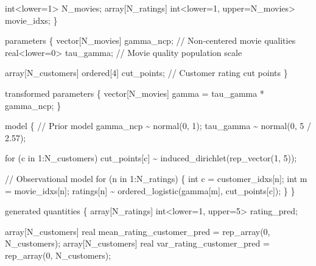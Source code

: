 \documentclass[
  letterpaper,
  DIV=11,
  numbers=noendperiod]{scrartcl}
\newenvironment{Shaded}{\begin{snugshade}}{\end{snugshade}}
\newcommand{\CommentTok}[1]{\textcolor[rgb]{0.37,0.37,0.37}{#1}}
\newcommand{\ControlFlowTok}[1]{\textcolor[rgb]{0.00,0.23,0.31}{#1}}
\newcommand{\DataTypeTok}[1]{\textcolor[rgb]{0.68,0.00,0.00}{#1}}
\newcommand{\DecValTok}[1]{\textcolor[rgb]{0.68,0.00,0.00}{#1}}
\newcommand{\FloatTok}[1]{\textcolor[rgb]{0.68,0.00,0.00}{#1}}
\newcommand{\KeywordTok}[1]{\textcolor[rgb]{0.00,0.23,0.31}{#1}}
\newcommand{\NormalTok}[1]{\textcolor[rgb]{0.00,0.23,0.31}{#1}}
\begin{document}
\begin{codelisting}
\begin{Shaded}
\begin{Highlighting}[]
  \DataTypeTok{int}\NormalTok{\textless{}}\KeywordTok{lower}\NormalTok{=}\DecValTok{1}\NormalTok{\textgreater{} N\_movies;}
  \DataTypeTok{array}\NormalTok{[N\_ratings] }\DataTypeTok{int}\NormalTok{\textless{}}\KeywordTok{lower}\NormalTok{=}\DecValTok{1}\NormalTok{, }\KeywordTok{upper}\NormalTok{=N\_movies\textgreater{} movie\_idxs;}
\NormalTok{\}}

\KeywordTok{parameters}\NormalTok{ \{}
  \DataTypeTok{vector}\NormalTok{[N\_movies] gamma\_ncp; }\CommentTok{// Non{-}centered movie qualities}
  \DataTypeTok{real}\NormalTok{\textless{}}\KeywordTok{lower}\NormalTok{=}\DecValTok{0}\NormalTok{\textgreater{} tau\_gamma;    }\CommentTok{// Movie quality population scale}

  \DataTypeTok{array}\NormalTok{[N\_customers] }\DataTypeTok{ordered}\NormalTok{[}\DecValTok{4}\NormalTok{] cut\_points; }\CommentTok{// Customer rating cut points}
\NormalTok{\}}

\KeywordTok{transformed parameters}\NormalTok{ \{}
  \DataTypeTok{vector}\NormalTok{[N\_movies] gamma = tau\_gamma * gamma\_ncp;}
\NormalTok{\}}

\KeywordTok{model}\NormalTok{ \{}
  \CommentTok{// Prior model}
\NormalTok{  gamma\_ncp \textasciitilde{} normal(}\DecValTok{0}\NormalTok{, }\DecValTok{1}\NormalTok{);}
\NormalTok{  tau\_gamma \textasciitilde{} normal(}\DecValTok{0}\NormalTok{, }\DecValTok{5}\NormalTok{ / }\FloatTok{2.57}\NormalTok{);}

  \ControlFlowTok{for}\NormalTok{ (c }\ControlFlowTok{in} \DecValTok{1}\NormalTok{:N\_customers)}
\NormalTok{    cut\_points[c] \textasciitilde{} induced\_dirichlet(rep\_vector(}\DecValTok{1}\NormalTok{, }\DecValTok{5}\NormalTok{));}

  \CommentTok{// Observational model}
  \ControlFlowTok{for}\NormalTok{ (n }\ControlFlowTok{in} \DecValTok{1}\NormalTok{:N\_ratings) \{}
    \DataTypeTok{int}\NormalTok{ c = customer\_idxs[n];}
    \DataTypeTok{int}\NormalTok{ m = movie\_idxs[n];}
\NormalTok{    ratings[n] \textasciitilde{} ordered\_logistic(gamma[m], cut\_points[c]);}
\NormalTok{  \}}
\NormalTok{\}}

\KeywordTok{generated quantities}\NormalTok{ \{}
  \DataTypeTok{array}\NormalTok{[N\_ratings] }\DataTypeTok{int}\NormalTok{\textless{}}\KeywordTok{lower}\NormalTok{=}\DecValTok{1}\NormalTok{, }\KeywordTok{upper}\NormalTok{=}\DecValTok{5}\NormalTok{\textgreater{} rating\_pred;}

  \DataTypeTok{array}\NormalTok{[N\_customers] }\DataTypeTok{real}\NormalTok{ mean\_rating\_customer\_pred}
\NormalTok{    = rep\_array(}\DecValTok{0}\NormalTok{, N\_customers);}
  \DataTypeTok{array}\NormalTok{[N\_customers] }\DataTypeTok{real}\NormalTok{ var\_rating\_customer\_pred}
\NormalTok{    = rep\_array(}\DecValTok{0}\NormalTok{, N\_customers);}


\end{Highlighting}
\end{Shaded}
\end{codelisting}
\end{document}
